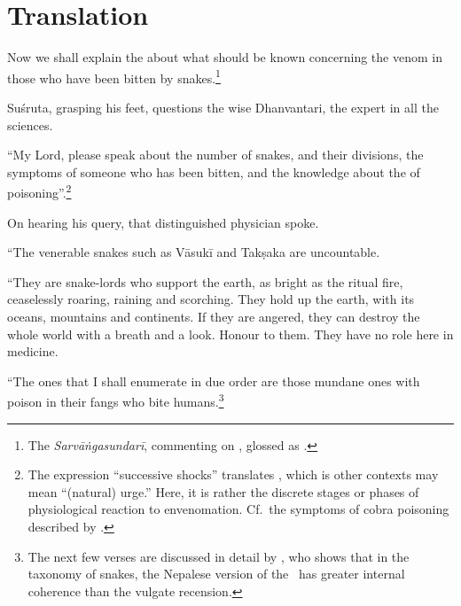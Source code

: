 \section{Translation}

\begin{translation}
    \item[1] Now we shall explain the  about what should be 
    known concerning the venom in those who have been bitten by
snakes.\footnote{The \emph{Sarvāṅgasundarī}, commenting on
    , glossed  as .}
    
    \item[3] Suśruta, grasping his feet, questions the wise Dhanvantari, the 
    expert in all the sciences.
    
    \item[4]
    
    “My Lord, please speak about the number of snakes, and their divisions,
the symptoms of someone who has been bitten, and the knowledge
about the  of poisoning”.\footnote{The
    expression “successive shocks” translates , which is other
    contexts may mean “(natural) urge.”  Here, it is rather the discrete
    stages or phases of physiological reaction to envenomation.  Cf.\ the
    symptoms of cobra poisoning described by \citet[80]{wall-1913}.}
        
    \item[5]
    
    On hearing his query, that distinguished physician spoke.
    
    “The venerable snakes such as Vāsukī and Takṣaka are uncountable. 
    
\item[6--9ab]

“They are snake-lords who support the earth, as bright as the ritual fire,
ceaselessly roaring, raining and scorching. They hold up the earth, with its
oceans, mountains and continents. If they are angered, they can destroy the
whole world with a breath and a look.  Honour to them. They have no role
here in medicine.

“The ones that I shall enumerate in due order are those mundane
ones with poison in their fangs who bite humans.\footnote{The next few
    verses are discussed in detail by \citet[101--104]{hari-2011}, who shows
    that in the taxonomy of snakes, the Nepalese version of the \SS\ has greater
    internal coherence than the vulgate recension.}


\end{translation}

